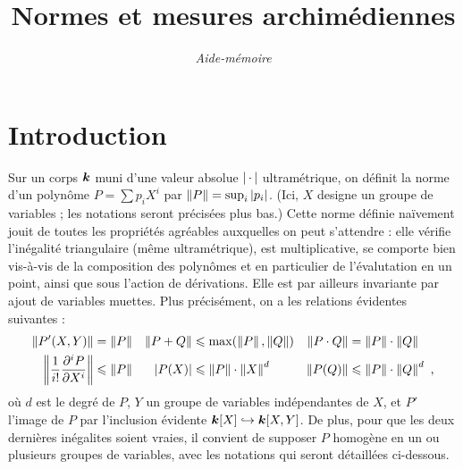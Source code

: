

%
\newcommand*\lgr[1]{\abs{#1}} %
\newcommand*\vlg[1]{\abs{#1}} %
\newcommand*\der[1]{\partial_{#1}} %
\newcommand*\ncoef[1]{\mathcal N(#1)} %
\newcommand*\maxbin[1]{m(#1)} %


%
\newcommand*\normsup[1]{\norm{#1}_\infty}
\newcommand*\normlun[1]{\norm{#1}_1}
\newcommand*\normeuc[1]{\norm{#1}_2}
\newcommand*\normhom[1]{\norm{#1}_{\mathrm h}}
\newcommand*\mespph[1]{\mathrm{M}(#1)}
\newcommand*\mahler[1]{\mathcal{M}(#1)}

\title{Normes et mesures archimédiennes}
\date{\itshape Aide-mémoire}



\maketitle

\section*{Introduction}

Sur un corps $\boldsymbol{k}$ muni d'une valeur absolue $\left\lvert{\,\cdot\,}\right\rvert$ ultramétrique, on
définit la norme d'un polynôme $P = \sum p_i X^i$ par $\left\lVert P\right\rVert = \sup_i
\left\lvert p_i\right\rvert$. (Ici, $X$ designe un groupe de variables ; les notations seront
précisées plus bas.) Cette norme définie naïvement jouit de toutes les
propriétés agréables auxquelles on peut s'attendre : elle vérifie l'inégalité
triangulaire (même ultramétrique), est multiplicative, se comporte bien
vis-à-vis de la composition des polynômes et en particulier de l'évalutation
en un point, ainsi que sous l'action de dérivations. Elle est par ailleurs
invariante par ajout de variables muettes. Plus précisément, on a les
relations évidentes suivantes :
\begin{align*}
  \left\lVert P'(X, Y)\right\rVert
  & = \left\lVert P\right\rVert   
  &
  \left\lVert P+Q\right\rVert
  & \leqslant \max (\left\lVert P\right\rVert, \left\lVert Q\right\rVert) 
  &
  \left\lVert P\cdot Q\right\rVert
  & = \left\lVert P\right\rVert \cdot \left\lVert Q\right\rVert
  \\
  \left\lVert \frac{1}{i!} \frac {\partial^i P} {\partial X^i} \right\rVert
  & \leqslant \left\lVert P\right\rVert
  &
  \left\lvert P(X)\right\rvert
  & \leqslant \left\lVert P\right\rVert \cdot \left\lVert X\right\rVert^d   
  &
  \left\lVert P(Q)\right\rVert
  & \leqslant \left\lVert P\right\rVert \cdot \left\lVert Q\right\rVert^d
  \text{ ,}
\end{align*}
où $d$ est le degré de $P$, $Y$ un groupe de variables indépendantes de $X$,
et $P'$ l'image de $P$ par l'inclusion évidente $\boldsymbol{k}[X] \hookrightarrow
\boldsymbol{k}[X, Y]$. De plus, pour que les deux dernières inégalites soient vraies, il
convient de supposer $P$ homogène en un ou plusieurs groupes de variables,
avec les notations qui seront détaillées ci-dessous.

